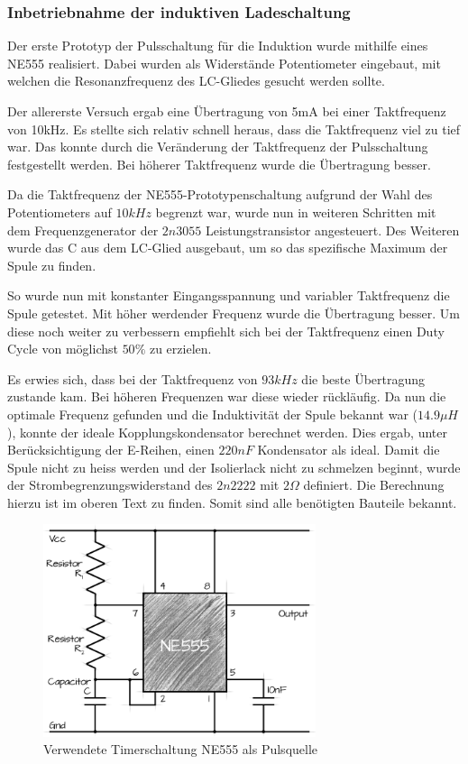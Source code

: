 \subsubsection*{Inbetriebnahme der induktiven Ladeschaltung}\label{sec:erkenntnisse}

Der erste Prototyp der Pulsschaltung für die Induktion wurde mithilfe eines NE555 realisiert. Dabei wurden als Widerstände Potentiometer eingebaut, mit welchen die Resonanzfrequenz des LC-Gliedes gesucht werden sollte.

Der allererste Versuch ergab eine Übertragung von 5mA bei einer Taktfrequenz von 10kHz. Es stellte sich relativ schnell heraus, dass die Taktfrequenz viel zu tief war. Das konnte durch die Veränderung der Taktfrequenz der Pulsschaltung festgestellt werden. Bei höherer Taktfrequenz wurde die Übertragung besser.

Da die Taktfrequenz der NE555-Prototypenschaltung aufgrund der Wahl des Potentiometers auf $10kHz$ begrenzt war, wurde nun in weiteren Schritten mit dem Frequenzgenerator der $2n3055$ Leistungstransistor angesteuert. Des Weiteren wurde das C aus dem LC-Glied ausgebaut, um so das spezifische Maximum der Spule zu finden.

So wurde nun mit konstanter Eingangsspannung und variabler Taktfrequenz die Spule getestet. Mit höher werdender Frequenz wurde die Übertragung besser. Um diese noch weiter zu verbessern empfiehlt sich bei der Taktfrequenz einen Duty Cycle von möglichst $50\%$ zu erzielen.

Es erwies sich, dass bei der Taktfrequenz von $93kHz$ die beste Übertragung zustande kam. Bei höheren Frequenzen war diese wieder rückläufig. Da nun die optimale Frequenz gefunden und die Induktivität der Spule bekannt war ($14.9\mu H$), konnte der ideale Kopplungskondensator berechnet werden. Dies ergab, unter Berücksichtigung der E-Reihen, einen $220nF$ Kondensator als ideal. Damit die Spule nicht zu heiss werden und der Isolierlack nicht zu schmelzen beginnt, wurde der Strombegrenzungswiderstand des $2n2222$ mit $2\Omega$ definiert. Die Berechnung hierzu ist im oberen Text zu finden. Somit sind alle benötigten Bauteile bekannt.

\begin{figure}[H]
	\begin{center}
		\includegraphics[width=80mm]{data/Ne555circuit.png}
		\caption[Verwendete Timerschaltung NE555 als Pulsquelle]{Verwendete Timerschaltung NE555 als Pulsquelle} %
		\label{fig:NE555}
	\end{center}
\end{figure}

